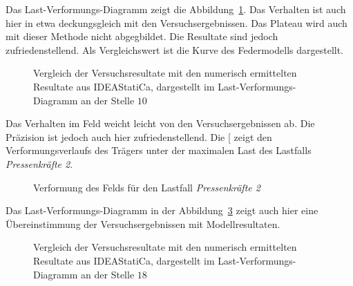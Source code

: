 \documentclass[
  11pt,
  letterpaper,
]{scrreprt}
\begin{document}
Das Last-Verformungs-Diagramm zeigt die
Abbildung~\ref{fig-p_w10_vergleich_idea}. Das Verhalten ist auch hier in
etwa deckungsgleich mit den Versuchsergebnissen. Das Plateau wird auch
mit dieser Methode nicht abgegbildet. Die Resultate sind jedoch
zufriedenstellend. Als Vergleichswert ist die Kurve des Federmodells
dargestellt.

\begin{figure}[H]


\caption{\label{fig-p_w10_vergleich_idea}Vergleich der Versuchsresultate
mit den numerisch ermittelten Resultate aus IDEAStatiCa, dargestellt im
Last-Verformungs-Diagramm an der Stelle \(10\)}

\end{figure}%

Das Verhalten im Feld weicht leicht von den Versuchsergebnissen ab. Die
Präzision ist jedoch auch hier zufriedenstellend. Die
{[}\citeproc{ref-fig_def_feld_ideastat}{\textbf{fig\_def\_feld\_ideastat?}}{]}
zeigt den Verformungsverlaufs des Trägers unter der maximalen Last des
Lastfalls \emph{Pressenkräfte 2}.

\begin{figure}[H]


\caption{\label{fig-def_feld_ideastat}Verformung des Felds für den
Lastfall \emph{Pressenkräfte 2}}

\end{figure}%

Das Last-Verformungs-Diagramm in der
Abbildung~\ref{fig-q_w18_vergleich_idea} zeigt auch hier eine
Übereinstimmung der Versuchsergebnissen mit Modellresultaten.

\begin{figure}[H]


\caption{\label{fig-q_w18_vergleich_idea}Vergleich der Versuchsresultate
mit den numerisch ermittelten Resultate aus IDEAStatiCa, dargestellt im
Last-Verformungs-Diagramm an der Stelle \(18\)}

\end{figure}%
\end{document}
